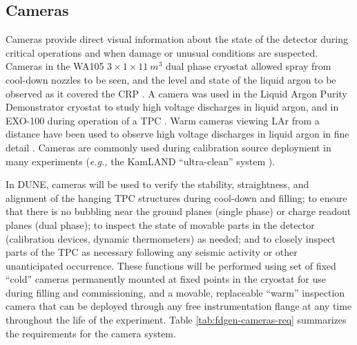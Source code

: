 \subsection{Cameras}
\label{sec:fdgen-slow-cryo-cameras}

Cameras provide direct visual information about the state of the
detector during critical operations and when damage or unusual
conditions are suspected.  Cameras in the WA105 \(3\times 1\times
1\SI{1}{m^3}\) dual phase cryostat allowed spray from cool-down
nozzles to be seen, and the level and state of the liquid argon to be
observed as it covered the CRP \cite{Murphy:20170516}.  A camera was
used in the Liquid Argon Purity Demonstrator
cryostat\cite{Adamowski:2014daa} to study high voltage discharges in
liquid argon, and in EXO-100 during operation of a TPC
\cite{Delaquis:2013hva}.  Warm cameras viewing LAr from a distance
have been used to observe high voltage discharges in liquid argon in
fine detail \cite{Auger:2015xlo}.  Cameras are commonly used during
calibration source deployment in many experiments ({\em e.g.,} the
KamLAND ``ultra-clean'' system \cite{Banks:2014hra}).

In DUNE, cameras will be used to verify the stability, straightness,
and alignment of the hanging TPC structures during cool-down and
filling; to ensure that there is no bubbling near the ground planes
(single phase) or charge readout planes (dual phase); to inspect the
state of movable parts in the detector (calibration devices, dynamic
thermometers) as needed; and to closely inspect parts of the TPC as
necessary following any seismic activity or other unanticipated
occurrence.  These functions will be performed using set of fixed
``cold'' cameras permanently mounted at fixed points in the cryostat
for use during filling and commissioning, and a movable, replaceable
``warm'' inspection camera that can be deployed through any free
instrumentation flange at any time throughout the life of the
experiment.  Table \ref{tab:fdgen-cameras-req} summarizes the
requirements for the camera system.

